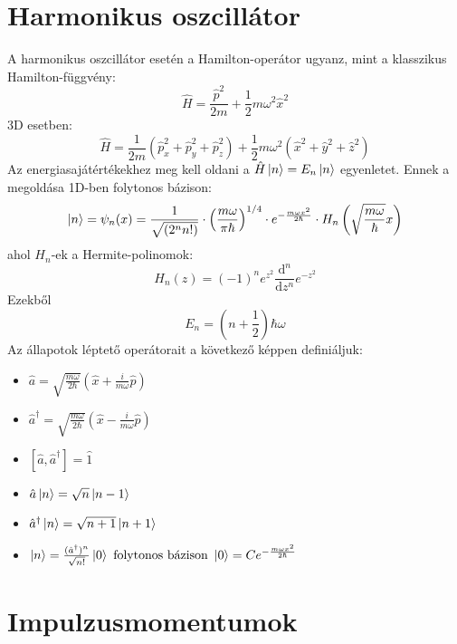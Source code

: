 \documentclass[12pt]{article}
\theoremstyle{plain}
\newcommand{\commut}[2]{\left [ #1 , #2 \right]}
\newcommand{\dd}{\mathrm{d}}
\begin{document}
\section{Harmonikus oszcillátor}
A harmonikus oszcillátor esetén a Hamilton-operátor ugyanz, mint a klasszikus Hamilton-függvény:
\begin{equation}
  \hat H = \frac{\hat p^2}{2m} + \frac{1}{2}m\omega^2 \hat x^2  
\end{equation}
3D esetben:
\begin{equation}
    \hat H = \frac{1}{2m}(\hat p_x^2+\hat p_y^2+\hat p_z^2) + \frac{1}{2}m\omega^2 (\hat x^2 + \hat y^2 + \hat z^2)  
\end{equation}
Az energiasajátértékekhez meg kell oldani a $\hat H \ket n = E_n \ket n$ egyenletet. Ennek a megoldása 1D-ben
folytonos bázison:
\begin{equation}
    \ket n = \psi_n(x) = \frac{1}{\sqrt{(2^n n!)}} \cdot \left (\frac{m\omega}{\pi\hbar}\right)^{1/4}
    \cdot e^{-\frac{m\omega x^2}{2\hbar}} \cdot H_n\left(\sqrt\frac{m\omega}{\hbar}x\right)    
\end{equation}
ahol $H_n$-ek a Hermite-polinomok:
\begin{equation}
    H_n(z) = (-1)^n e^z^2 \frac{\dd^n}{\dd z^n}e^{-z^2}
\end{equation}
Ezekből 
\begin{equation}
    E_n = \left(n + \frac{1}{2}\right)   \hbar \omega 
\end{equation}
\pagebreak
Az állapotok léptető operátorait a következő képpen definiáljuk:
\begin{itemize}
    \item $
        \hat a = \sqrt{\frac{m\omega}{2\hbar}}\left(\hat x + \frac{i}{m\omega}\hat p\right)
    $
    \item $
       \hat a^{\dag} = \sqrt{\frac{m\omega}{2\hbar}}\left(\hat x - \frac{i}{m\omega}\hat p\right)
    $
    \item $
        \commut{\hat a}{\hat a^{\dag}} = \hat 1
    $
    \item $
        \hat a \ket n = \sqrt n \ket{n-1}
    $
    \item $
        \hat a^{\dag} \ket n = \sqrt{n+1}\ket{n+1}
    $
    \item $
        \ket n = \frac{(\hat a^{\dag})^n}{\sqrt{n!}}\ket 0 
        \textrm{  folytonos bázison  } \ket 0 = Ce^{-\frac{m\omega x^2}{2\hbar}}
    $
\end{itemize}


\section{Impulzusmomentumok}
\end{document}
